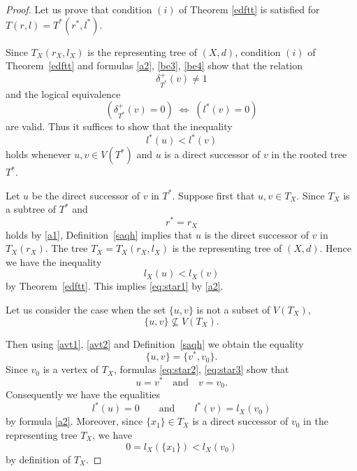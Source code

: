 \documentclass[pdflatex,sn-mathphys-num]{sn-jnl}%
\theoremstyle{thmstyleone}%
\theoremstyle{thmstyletwo}%
\theoremstyle{thmstylethree}%
\theoremstyle{thmstyletwo}%
\theoremstyle{thmstylethree}%
\begin{document}
\begin{proof}
Let us prove that condition $(i)$ of Theorem \ref{edftt} is satisfied for $T(r,l)=T^*(r^*,l^*)$.




Since \(T_X(r_X,l_X)\) is the representing tree of \((X,d)\), condition $(i)$ of Theorem~\ref{edftt} and formulas \eqref{a2}, \eqref{be3},  \eqref{be4} show that the relation
\begin{equation}
    \label{be5}
\delta^{+}_{T^*}(v) \neq 1 
\end{equation}
and the logical equivalence
\begin{equation}
    \label{be6}
(\delta^{+}_{T^*}(v)=0)\;\Longleftrightarrow\; (l^{*}(v)=0) 
\end{equation}
are valid.
Thus it suffices to show that the inequality
\begin{equation}\label{eq:star1}
l^{*}(u)<l^{*}(v)
\end{equation}
holds whenever \(u,v\in V(T^{*})\) and \(u\) is a direct successor of \(v\) in the rooted tree \(T^{*}\).

Let \(u\) be the direct successor of \(v\) in \(T^{*}\). Suppose first that \(u,v\in T_X\).
Since \(T_X\) is a subtree of \(T^{*}\) and \[r^{*}=r_X\] holds by \eqref{a1}, Definition~\ref{saqh} implies that \(u\) is the direct successor of \(v\) in \(T_X(r_X)\).
The tree \(T_X=T_X(r_X,l_X)\) is the representing tree of \((X,d)\).
Hence we have the inequality
\[
l_X(u)<l_X(v)
\]
by Theorem~\ref{edftt}. 
This implies \eqref{eq:star1} by \eqref{a2}.


Let us consider the case when the set \(\{u,v\}\) is not a subset of \(V(T_X)\),
\begin{equation}\label{eq:star2}
\{u,v\}\not\subseteq V(T_X).
\end{equation}

Then using \eqref{avt1}, \eqref{avt2} and Definition~\ref{saqh} we obtain the equality
\begin{equation}\label{eq:star3}
\{u,v\}=\{v^{*},v_0\}.
\end{equation}
Since \(v_0\) is a vertex of \(T_X\), formulas \eqref{eq:star2}, \eqref{eq:star3} show that
\begin{equation}\label{eq:star4}
u=v^{*}\quad\text{and}\quad v=v_0.
\end{equation}
Consequently we have the equalities
\begin{equation}\label{eq:star5}
l^{*}(u)=0
\qquad\text{and}\qquad
l^{*}(v)=l_X(v_0)
\end{equation}
by formula \eqref{a2}.
Moreover, since \(\{x_1\}\in T_X\) is a direct successor of \(v_0\) in the representing tree \(T_X\), we have
\begin{equation}\label{eq:star6}
0= l_X(\{x_1\})<l_X(v_0)
\end{equation}
by definition of $T_X$.


\end{proof}
\end{document}
